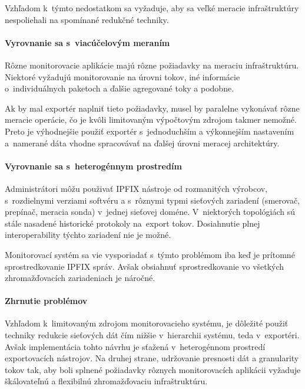 Vzhľadom k~týmto nedostatkom sa vyžaduje, aby sa veľké meracie infraštruktúry nespoliehali na 
spomínané redukčné techniky.


\paragraph{Vyrovnanie sa s~viacúčelovým meraním}

Rôzne monitorovacie aplikácie majú rôzne požiadavky na meraciu infraštruktúru. Niektoré vyžadujú 
monitorovanie na úrovni tokov, iné informácie o~individuálnych paketoch a ďalšie agregované toky a podobne.

Ak by mal exportér naplniť tieto požiadavky, musel by paralelne vykonávať rôzne meracie operácie, čo je
kvôli limitovaným výpočtovým zdrojom takmer nemožné. Preto je výhodnejšie použiť exportér s~jednoduchším a 
výkonnejším nastavením a~namerané dáta vhodne spracovávať na ďalšej úrovni meracej architektúry.



\paragraph{Vyrovnanie sa s~heterogénnym prostredím}

Administrátori môžu použivať IPFIX nástroje od rozmanitých výrobcov, s~rozdielnymi verziami softvéru a
s~rôznymi typmi sieťových zariadení (smerovač, prepínač, meracia sonda) v~jednej sieťovej doméne.
V~niektorých topológiách sú stále nasadené historické protokoly na~export tokov. Dosiahnutie plnej 
interoperability týchto zariadení nie je možné.

Monitorovací systém sa vie vysporiadať s~týmto problémom iba keď je prítomné sprostredkovanie IPFIX správ.
Avšak obsiahnuť sprostredkovanie vo všetkých zhromažďovacích zariadeniach je náročné.


\paragraph{Zhrnutie problémov}

Vzhľadom k~limitovaným zdrojom monitorovacieho systému, je dôležité použiť techniky redukcie sieťových 
dát čím nižšie v~hierarchii systému, teda v~exportéri. Avšak implementácia tohto návrhu je sťažená
v~heterogénnom prostredí exportovacích nástrojov. 
Na druhej strane, udržovanie presnosti dát a granularity tokov tak, aby boli splnené požiadavky 
rôznych monitorovacích aplikácii vyžaduje škálovateľnú a flexibilnú zhromažďovaciu infraštruktúru.

